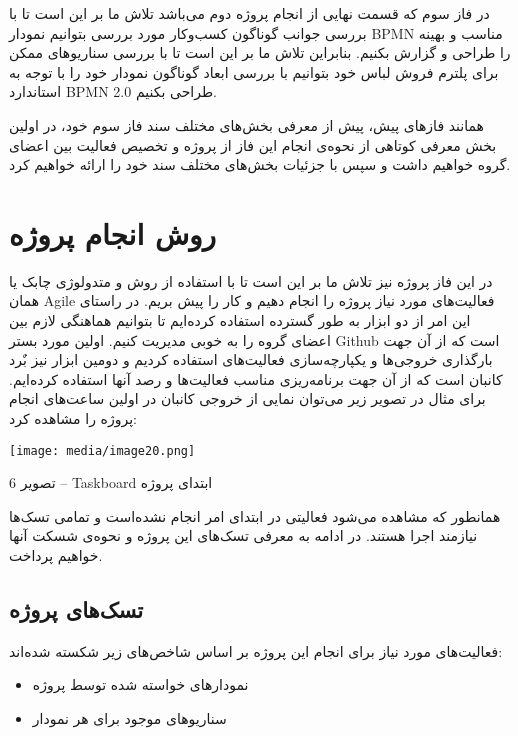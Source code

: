 \documentclass[]{article}
\begin{document}
در فاز سوم که قسمت نهایی از انجام پروژه دوم می‌باشد تلاش ما بر این است
تا با بررسی جوانب گوناگون کسب‌وکار مورد بررسی بتوانیم نمودار BPMN مناسب
و بهینه را طراحی و گزارش بکنیم. بنابراین تلاش ما بر این است تا با بررسی
سناریو‌های ممکن برای پلترم فروش لباس خود بتوانیم با بررسی ابعاد گوناگون
نمودار خود را با توجه به استاندارد BPMN 2.0 طراحی بکنیم.

همانند فازهای پیش، پیش از معرفی بخش‌های مختلف سند فاز سوم خود، در اولین
بخش معرفی کوتاهی از نحوه‌ی انجام این فاز از پروژه و تخصیص فعالیت بین
اعضای گروه خواهیم داشت و سپس با جزئیات بخش‌های مختلف سند خود را ارائه
خواهیم کرد.

\section{روش انجام
پروژه}\label{ux631ux648ux634-ux627ux646ux62cux627ux645-ux67eux631ux648ux698ux647-2}

در این فاز پروژه نیز تلاش ما بر این است تا با استفاده از روش و متدولوژی
چابک یا همان Agile فعالیت‌های مورد نیاز پروژه را انجام دهیم و کار را پیش
بریم. در راستای این امر از دو ابزار به طور گسترده استفاده کرده‌ایم تا
بتوانیم هماهنگی لازم بین اعضای گروه را به خوبی مدیریت کنیم. اولین مورد
بستر Github است که از آن جهت بارگذاری خروجی‌ها و یکپارچه‌سازی فعالیت‌های
استفاده کردیم و دومین ابزار نیز بٌرد کانبان است که از آن جهت برنامه‌ریزی
مناسب فعالیت‌ها و رصد آنها استفاده کرده‌ایم. برای مثال در تصویر زیر
می‌توان نمایی از خروجی کانبان در اولین ساعت‌های انجام پروژه را مشاهده
کرد:

\texttt{[image: media/image20.png]}

تصویر 6 -- Taskboard ابتدای پروژه

همانطور که مشاهده می‌شود فعالیتی در ابتدای امر انجام نشده‌است و تمامی
تسک‌ها نیازمند اجرا هستند. در ادامه به معرفی تسک‌های این پروژه و نحوه‌ی
شسکت‌ آنها خواهیم پرداخت.

\subsection{تسک‌های
پروژه}\label{ux62aux633ux6a9ux647ux627ux6cc-ux67eux631ux648ux698ux647-2}

فعالیت‌های مورد نیاز برای انجام این پروژه بر اساس شاخص‌های زیر شکسته
شده‌اند:

\begin{itemize}
\item
  نمودارهای خواسته شده توسط پروژه
\item
  سناریوهای موجود برای هر نمودار
\end{itemize}
\end{document}
